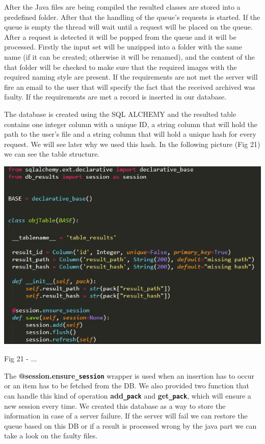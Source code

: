 \documentclass[12pt, a4paper]{report}
\begin{document}
After the Java files are being compiled the resulted classes are stored into a predefined folder. After that the handling of the queue's requests is started. If the queue is empty the thread will wait until a request will be placed on the queue. After a request is detected it will be popped from the queue and it will be processed. Firstly the input set will be unzipped into a folder with the same name (if it can be created; otherwise it will be renamed), and the content of the that folder will be checked to make sure that the required images with the required naming style are present. If the requirements are not met the server will fire an email to the user that will specify the fact that the received archived was faulty. If the requirements are met a record is inserted in our database.
\par 

The database is created using the SQL ALCHEMY and the resulted table contains one integer column with a unique ID, a string column that will hold the path to the user's file and a string column that will hold a unique hash for every request. We will see later why we used this hash. In the following picture (Fig 21) we can see the table structure.
\par

\medskip
\includegraphics[scale=0.9, right]{database_table.png}
\begin{center}
Fig 21 - ... 
\end{center}
\par 

The \textbf{@session.ensure\texttt{\_session}} wrapper is used when an insertion has to occur or an item has to be fetched from the DB. We also provided two function that can handle this kind of operation \textbf{add\texttt{\_pack}} and \textbf{get\texttt{\_pack}}, which will ensure a new session every time. We created this database as a way to store the information in case of a server failure. If the server will fail we can restore the queue based on this DB or if a result is processed wrong by the java part we can take a look on the faulty files.
\par 
\end{document}
